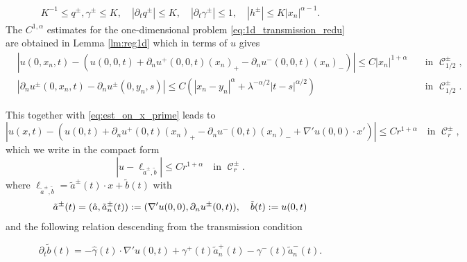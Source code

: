 \documentclass[12pt]{article}
\makeatletter
\newenvironment{customproof}[1]{%
  \par\pushQED{\qed}%
  \normalfont\topsep6pt \trivlist
  \item[\hskip\labelsep\itshape
    Proof of #1\@addpunct{.}]\ignorespaces
}{%
  \popQED\endtrivlist\@endpefalse
}
\numberwithin{Theorem}{section}
\theoremstyle{definition}
\theoremstyle{remark}
\numberwithin{equation}{section}
\DeclareMathOperator{\C}{\mathcal{C}}
\newcommand{\p}{\partial}
\makeatother
\begin{document}
\begin{customproof}{Theorem \ref{Thm:C1gamma}}
\begin{equation}
\begin{aligned}
            K^{-1} \leq q^{\pm},\gamma^{\pm} \leq K, \quad |\p_t q^{\pm}| \leq K, \quad |\p_t \gamma^\pm| \leq 1, \quad |h^\pm|\leq K|x_n|^{{ \alpha}-1}.
        \end{aligned}
    \end{equation}
The $C^{1,{ \alpha}}$ estimates for the one-dimensional problem \eqref{eq:1d_transmission_redu} are obtained in Lemma \ref{lm:reg1d} which in terms of $u$ gives
\begin{equation} \label{eq:est_on_w}
    \begin{aligned}
    &\left| u(0,x_n,t) - \left( u(0,0,t) + \p_n u^{+}(0,0,t) (x_n)_+ -  \p_n u^{-}(0,0,t) (x_n)_- \right)\right| \leq C |x_n|^{1+{ \alpha}} \quad &\text{in }\C_{1/2}^{\pm}, \\
     &\left|\p_n u^{\pm}(0,x_n,t)- \p_n u^{\pm}(0,y_n,s)\right| \leq C \left( |x_n-y_n|^{{ \alpha}}+ \lambda^{-{ \alpha}/2} |t-s|^{{ \alpha}/2}\right) \quad &\text{in }\C_{1/2}^{\pm}.
\end{aligned}
\end{equation}

   This together with \eqref{eq:est_on_x_prime} leads to 
   \[
   |u(x,t)-\left( u(0,t) + \p_n u^+(0,t) (x_n)_{+} - \p_n u^-(0,t) (x_n)_{-}  + \nabla'u(0,0) \cdot x'\right)| \leq C r^{1+{ \alpha}} \quad \text{in }\C_{r}^{\pm},
   \]
   which we write in the compact form
   \[
   |u-\ell_{\tilde a^\pm,\tilde b}| \leq C r^{1+{\alpha}} \quad \text{in }    \C_{r}^{\pm}.
   \]
   where $\ell_{\tilde a^\pm, \tilde b}=\tilde a^{\pm}(t) \cdot x + \tilde b(t)$
   with
   \[
   \tilde a^\pm(t)=(\Hat{a},\tilde a_n^\pm(t)):=(\nabla' u(0,0),\p_n u^\pm(0,t) ) ,\quad \tilde b(t):=u(0,t)
   \]
   and the following relation descending from the transmission condition

   \[
 \p_t \tilde b(t)= -\hat{\gamma}(t) \cdot \nabla'u(0,t) + \gamma^+(t) \tilde a_n^+(t) - \gamma^-(t) \tilde a_n^-(t).
   \]


\end{customproof}
\end{document}
